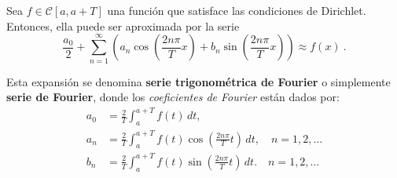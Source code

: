 \begin{defi} 
Sea $f \in \mathscr{C}[a, a+T]$ una función que satisface las condiciones de Dirichlet. Entonces, ella puede ser aproximada por la serie 
\begin{equation}
    \frac{a_0}{2} + \sum_{n=1}^{\infty} \left( a_n \cos\left( \frac{2n\pi}{T}x \right) + b_n \sin\left( \frac{2n\pi}{T}x \right) \right) \approx f(x) \ . \label{FourierTrigo}
\end{equation}

Esta expansión se denomina \textbf{serie trigonométrica de Fourier} o simplemente \textbf{serie de Fourier}, donde los \textit{coeficientes de Fourier} están dados por:
\begin{align*}
    a_0 &= \frac{2}{T} \int_{a}^{a+T} f(t) \,dt, \\
    a_n &= \frac{2}{T} \int_{a}^{a+T} f(t) \cos\left( \frac{2n\pi}{T}t \right) \,dt, \quad n = 1,2, \dots\\
    b_n &= \frac{2}{T} \int_{a}^{a+T} f(t) \sin\left( \frac{2n\pi}{T}t \right) \,dt. \quad n = 1,2, \dots
\end{align*}
\end{defi}

